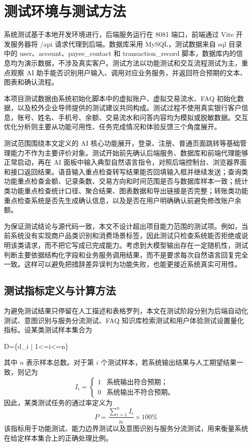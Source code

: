 \documentclass[bachelor, print]{xduthesis}
\begin{document}
\section{测试环境与测试方法}

系统测试基于本地开发环境进行，后端服务运行在 8081 端口，前端通过 Vite 开发服务器将 /api 请求代理到后端。数据库采用 MySQL，测试数据来自 sql 目录中的 user、account、payee\_contact 和 transaction\_record 脚本，数据库内的信息均为演示数据，不涉及真实客户。测试方法以功能测试和交互流程测试为主，重点观察 AI 助手能否识别用户输入、调用对应业务服务，并返回符合预期的文本、图表和确认流程。

本项目测试数据由系统初始化脚本中的虚拟账户、虚拟交易流水、FAQ 初始化数据，以及校外企业导师提供的测试建议共同构成。测试过程不使用真实银行客户信息，账号、姓名、手机号、余额、交易流水和问答内容均为模拟或脱敏数据。交互优化分析则主要从功能可用性、任务完成情况和体验反馈三个角度展开。

测试范围围绕本文定义的 AI 核心功能展开，登录、注册、普通页面跳转等基础管理能力不作为主要评价对象。测试开始前先确认后端服务、数据库和前端代理能够正常启动，再在 AI 面板中输入典型自然语言指令，对照后端控制台、浏览器界面和接口返回结果。语音输入重点检查转写结果能否回填输入框并继续发送；查询类功能重点检查金额、记录条数、交易方向和时间范围是否与数据库样本一致；统计类功能重点检查统计口径、聚合结果、图表数据和导出链接是否完整；转账类功能重点检查系统是否先生成确认信息，以及是否在用户明确确认前避免修改账户余额。

为保证测试结论与源代码一致，本文不设计超出项目能力范围的测试项。例如，当前系统没有实现商户品类识别和消费场景标签，因此测试只检查系统能否拒绝或说明该类请求，而不把它写成已完成能力。考虑到大模型输出存在一定随机性，测试判断主要依据结构化字段和业务服务调用结果，而不是要求每次自然语言回复完全一致。这样可以避免把措辞差异误判为功能失败，也能更接近系统真实可用性。

\subsection{测试指标定义与计算方法}

为避免测试结果只停留在人工描述和表格罗列，本文在测试阶段分别为后端自动化测试、意图识别与服务分流测试、FAQ 知识库检索测试和用户体验测试设置量化指标。设某类测试样本集合为
\begin{center}
\textrm{D=\{d\_i | 1<=i<=n\}}
\end{center}
其中 \(n\) 表示样本总数。对于第 \(i\) 个测试样本，若系统输出结果与人工期望结果一致，则记为
\[
I_i=
\begin{cases}
1 & \text{系统输出符合预期；}\\
0 & \text{系统输出不符合预期。}
\end{cases}
\]
因此，某类测试任务的通过率定义为
\[
P=\frac{\sum_{i=1}^{n} I_i}{n}\times 100\%
\]
该指标用于功能测试、能力边界测试以及意图识别与服务分流测试，用来衡量系统在给定样本集合上的正确处理比例。
\end{document}
